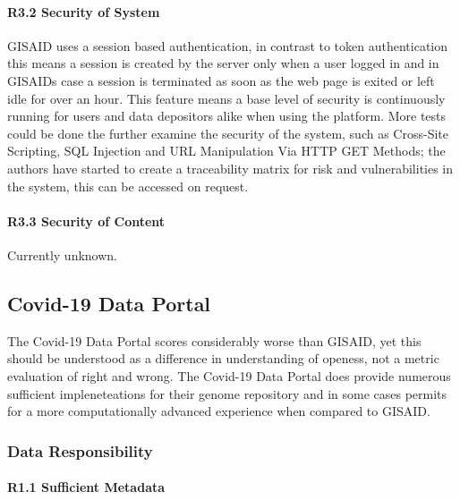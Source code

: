 \documentclass{article}
\begin{document}
\hypertarget{r3.2-security-of-system}{%
\paragraph{R3.2 Security of System}\label{r3.2-security-of-system}}

GISAID uses a session based authentication, in contrast to token
authentication this means a session is created by the server only when a
user logged in and in GISAIDs case a session is terminated as soon as
the web page is exited or left idle for over an hour. This feature means
a base level of security is continuously running for users and data
depositors alike when using the platform. More tests could be done the
further examine the security of the system, such as Cross-Site
Scripting, SQL Injection and URL Manipulation Via HTTP GET Methods; the
authors have started to create a traceability matrix for risk and
vulnerabilities in the system, this can be accessed on request.

\hypertarget{r3.3-security-of-content}{%
\paragraph{R3.3 Security of Content}\label{r3.3-security-of-content}}

Currently unknown.

\hypertarget{covid-19-data-portal}{%
\subsection{Covid-19 Data Portal}\label{covid-19-data-portal}}

The Covid-19 Data Portal scores considerably worse than GISAID, yet this
should be understood as a difference in understanding of openess, not a
metric evaluation of right and wrong. The Covid-19 Data Portal does
provide numerous sufficient impleneteations for their genome repository
and in some cases permits for a more computationally advanced experience
when compared to GISAID.

\hypertarget{data-responsibility-2}{%
\subsubsection{Data Responsibility}\label{data-responsibility-2}}

\hypertarget{r1.1-sufficient-metadata-1}{%
\paragraph{R1.1 Sufficient Metadata}\label{r1.1-sufficient-metadata-1}}
\end{document}
